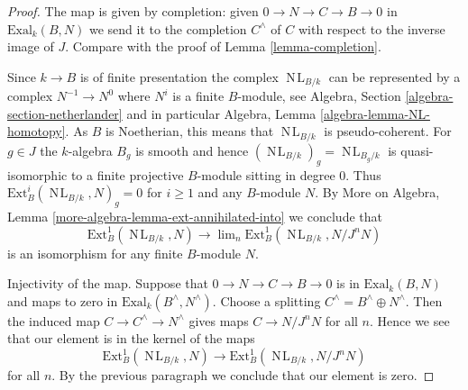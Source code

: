 \documentclass[10pt,a4paper]{amsart}
\theoremstyle{plain}
\theoremstyle{definition}
\theoremstyle{remark}
\numberwithin{equation}{subsection}
\def\lim{\mathop{\mathrm{lim}}\nolimits}
\def\NL{\mathop{N\!L}\nolimits}
\begin{document}
\begin{proof}
The map is given by completion: given $0 \to N \to C \to B \to 0$
in $\text{Exal}_k(B, N)$ we send it to the completion $C^\wedge$
of $C$ with respect to the inverse image of $J$. Compare with
the proof of Lemma \ref{lemma-completion}.

\medskip\noindent
Since $k \to B$ is of finite presentation the complex
$\NL_{B/k}$ can be represented by a complex
$N^{-1} \to N^0$ where $N^i$ is a finite $B$-module, see
Algebra, Section \ref{algebra-section-netherlander} and
in particular
Algebra, Lemma \ref{algebra-lemma-NL-homotopy}.
As $B$ is Noetherian, this means that $\NL_{B/k}$
is pseudo-coherent. For $g \in J$ the $k$-algebra $B_g$
is smooth and hence $(\NL_{B/k})_g = \NL_{B_g/k}$
is quasi-isomorphic to a finite projective $B$-module sitting in degree $0$.
Thus $\text{Ext}^i_B(\NL_{B/k}, N)_g = 0$ for $i \geq 1$
and any $B$-module $N$. By
More on Algebra, Lemma \ref{more-algebra-lemma-ext-annihilated-into}
we conclude that
$$
\text{Ext}^1_B(\NL_{B/k}, N) \longrightarrow
\lim_n \text{Ext}^1_B(\NL_{B/k}, N/J^n N)
$$
is an isomorphism for any finite $B$-module $N$.

\medskip\noindent
Injectivity of the map.
Suppose that $0 \to N \to C \to B \to 0$ is in $\text{Exal}_k(B, N)$
and maps to zero in $\text{Exal}_k(B^\wedge, N^\wedge)$.
Choose a splitting $C^\wedge = B^\wedge \oplus N^\wedge$.
Then the induced map $C \to C^\wedge \to N^\wedge$
gives maps $C \to N/J^nN$ for all $n$.
Hence we see that our element is in the kernel of the maps
$$
\text{Ext}^1_B(\NL_{B/k}, N) \to
\text{Ext}^1_B(\NL_{B/k}, N/J^n N)
$$
for all $n$. By the previous paragraph we conclude that
our element is zero.


\end{proof}
\end{document}
